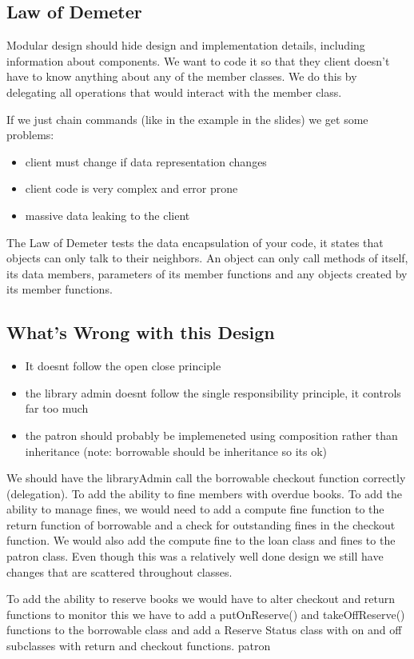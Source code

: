 \documentclass[12pt]{article}
\begin{document}
\subsection*{Law of Demeter}
Modular design should hide design and implementation details, including information about components. We want to code it so that they client doesn't have to know anything about any of the member classes. We do this by delegating all operations that would interact with the member class.

If we just chain commands (like in the example in the slides) we get some problems:
\begin{itemize}
    \item client must change if data representation changes
    \item client code is very complex and error prone
    \item massive data leaking to the client
\end{itemize}

The Law of Demeter tests the data encapsulation of your code, it states that objects can only talk to their neighbors. An object can only call methods of itself, its data members, parameters of its member functions and any objects created by its member functions.

\subsection*{What's Wrong with this Design}
\begin{itemize}
    \item It doesnt follow the open close principle
    \item the library admin doesnt follow the single responsibility principle, it controls far too much
    \item the patron should probably be implemeneted using composition rather than inheritance (note: borrowable should be inheritance so its ok)
\end{itemize}

We should have the libraryAdmin call the borrowable checkout function correctly (delegation). To add the ability to fine members with overdue books. To add the ability to manage fines, we would need to add a compute fine function to the return function of borrowable and a check for outstanding fines in the checkout function. We would also add the compute fine to the loan class and fines to the patron class. Even though this was a relatively well done design we still have changes that are scattered throughout classes.

To add the ability to reserve books we would have to alter checkout and return functions to monitor this we have to add a putOnReserve() and takeOffReserve() functions to the borrowable class and add a Reserve Status class with on and off subclasses with return and checkout functions. patron
\end{document}
